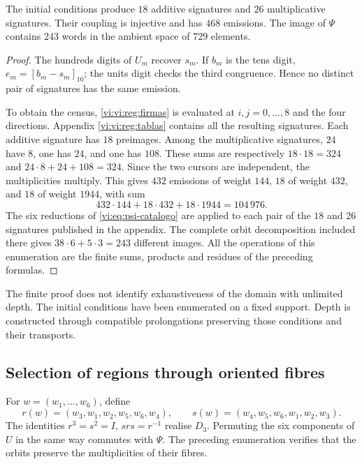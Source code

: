 \begin{proposition}
\label{vi:vi:reg:censo}
The initial conditions produce \(18\) additive signatures and \(26\)
multiplicative signatures. Their coupling is injective and has \(468\)
emissions. The image of \(\Psi\) contains \(243\) words in the
ambient space of \(729\) elements.
\end{proposition}
\begin{proof}
The hundreds digits of \(U_m\) recover \(s_m\). If \(b_m\) is the
tens digit, \(e_m=[b_m-s_m]_{10}\); the units digit
checks the third congruence. Hence no distinct pair
of signatures has the same emission.

To obtain the census, \eqref{vi:vi:reg:firmas} is evaluated at
\(i,j=0,\ldots,8\) and the four directions. Appendix
\ref{vi:vi:reg:tablas} contains all the resulting signatures. Each
additive signature has \(18\) preimages. Among the multiplicative signatures,
\(24\) have \(8\), one has \(24\), and one has \(108\).
These sums are respectively \(18\cdot18=324\) and
\(24\cdot8+24+108=324\). Since the two cursors are
independent, the multiplicities multiply. This gives
\(432\) emissions of weight \(144\), \(18\) of weight \(432\), and
\(18\) of weight \(1944\), with sum
\[
 432\cdot144+18\cdot432+18\cdot1944=104\,976.
\]
The six reductions of \eqref{vi:eq:psi-catalogo} are applied to each pair
of the \(18\) and \(26\) signatures published in the appendix. The
complete orbit decomposition included there gives
\(38\cdot6+5\cdot3=243\) different images. All the
operations of this enumeration are the finite sums, products and residues
of the preceding formulas.
\end{proof}

The finite proof does not identify exhaustiveness of the domain with
unlimited depth. The initial conditions have been enumerated on
a fixed support. Depth is constructed through compatible
prolongations preserving those conditions and their transports.

\subsection{Selection of regions through oriented fibres}

For \(w=(w_1,\ldots,w_6)\), define
\[
 r(w)=(w_3,w_1,w_2,w_5,w_6,w_4),\qquad
 s(w)=(w_4,w_5,w_6,w_1,w_2,w_3).
\]
The identities \(r^3=s^2=I\), \(srs=r^{-1}\) realise
\(D_3\). Permuting the six components of \(U\) in the same way
commutes with \(\Psi\). The preceding enumeration verifies that the
orbits preserve the multiplicities of their fibres.

